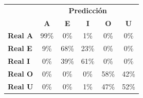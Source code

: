 \begin{tabular}{lccccc}
\toprule
 & \multicolumn{5}{c}{\textbf{Predicción}} \\
 & \textbf{A} & \textbf{E} & \textbf{I} & \textbf{O} & \textbf{U} \\
\midrule
\textbf{Real A} & \cellcolor[rgb]{0.31,0.31,1.00} \color{white} 99\% & \cellcolor[rgb]{1.00,1.00,1.00}  0\% & \cellcolor[rgb]{0.99,0.99,1.00}  1\% & \cellcolor[rgb]{1.00,1.00,1.00}  0\% & \cellcolor[rgb]{1.00,1.00,1.00}  0\% \\
\textbf{Real E} & \cellcolor[rgb]{0.94,0.94,1.00}  9\% & \cellcolor[rgb]{0.52,0.52,1.00} \color{white} 68\% & \cellcolor[rgb]{0.84,0.84,1.00}  23\% & \cellcolor[rgb]{1.00,1.00,1.00}  0\% & \cellcolor[rgb]{1.00,1.00,1.00}  0\% \\
\textbf{Real I} & \cellcolor[rgb]{1.00,1.00,1.00}  0\% & \cellcolor[rgb]{0.73,0.73,1.00}  39\% & \cellcolor[rgb]{0.57,0.57,1.00} \color{white} 61\% & \cellcolor[rgb]{1.00,1.00,1.00}  0\% & \cellcolor[rgb]{1.00,1.00,1.00}  0\% \\
\textbf{Real O} & \cellcolor[rgb]{1.00,1.00,1.00}  0\% & \cellcolor[rgb]{1.00,1.00,1.00}  0\% & \cellcolor[rgb]{1.00,1.00,1.00}  0\% & \cellcolor[rgb]{0.60,0.60,1.00} \color{white} 58\% & \cellcolor[rgb]{0.70,0.70,1.00}  42\% \\
\textbf{Real U} & \cellcolor[rgb]{1.00,1.00,1.00}  0\% & \cellcolor[rgb]{1.00,1.00,1.00}  0\% & \cellcolor[rgb]{0.99,0.99,1.00}  1\% & \cellcolor[rgb]{0.67,0.67,1.00}  47\% & \cellcolor[rgb]{0.64,0.64,1.00} \color{white} 52\% \\
\bottomrule
\end{tabular}